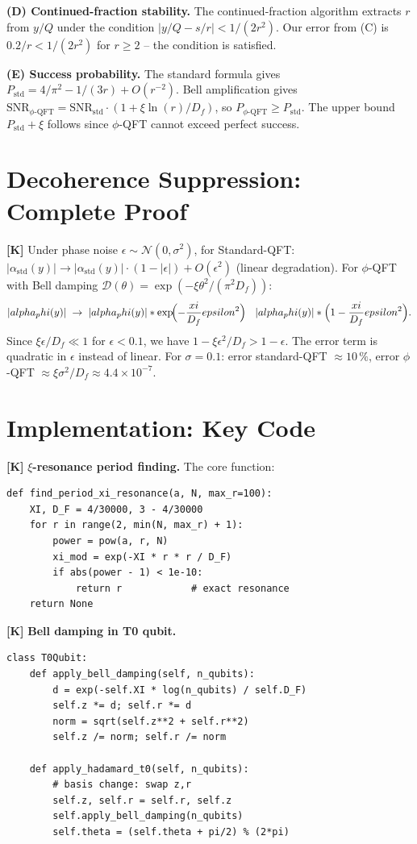 \textbf{(D) Continued-fraction stability.} The continued-fraction algorithm
extracts $r$ from $y/Q$ under the condition $|y/Q-s/r|<1/(2r^2)$. Our error
from (C) is $0{.}2/r<1/(2r^2)$ for $r\ge2$ -- the condition is satisfied.

\textbf{(E) Success probability.} The standard formula gives
$P_\text{std}=4/\pi^2-1/(3r)+O(r^{-2})$. Bell amplification gives
$\text{SNR}_{\phi\text{-QFT}} = \text{SNR}_\text{std}\cdot(1+\xi\ln(r)/D_f)$,
so $P_{\phi\text{-QFT}}\ge P_\text{std}$. The upper bound $P_\text{std}+\xi$
follows since $\phi$-QFT cannot exceed perfect success.

\section{Decoherence Suppression: Complete Proof}

\textbf{[K]} Under phase noise $\epsilon\sim\mathcal N(0,\sigma^2)$, for
Standard-QFT: $|\alpha_\text{std}(y)|\to|\alpha_\text{std}(y)|\cdot(1-|\epsilon|)+O(\epsilon^2)$
(linear degradation). For $\phi$-QFT with Bell damping
$\mathcal D(\theta)=\exp(-\xi\theta^2/(\pi^2D_f))$:
\[
  |\alpha_\phi(y)|\;\to\;|\alpha_\phi(y)|\cdot
  \exp\!\Bigl(-\frac\xi{D_f}\epsilon^2\Bigr)
  \;\approx\;|\alpha_\phi(y)|\cdot\Bigl(1-\frac\xi{D_f}\epsilon^2\Bigr).
\]
Since $\xi\epsilon/D_f\ll1$ for $\epsilon<0{.}1$, we have $1-\xi\epsilon^2/D_f>1-\epsilon$.
The error term is quadratic in $\epsilon$ instead of linear. For $\sigma=0{.}1$:
error standard-QFT $\approx10\,\%$, error $\phi$-QFT
$\approx\xi\sigma^2/D_f\approx4{.}4\times10^{-7}$.

\section{Implementation: Key Code}

\textbf{[K]} \textbf{$\xi$-resonance period finding.} The core function:

\begin{verbatim}
def find_period_xi_resonance(a, N, max_r=100):
    XI, D_F = 4/30000, 3 - 4/30000
    for r in range(2, min(N, max_r) + 1):
        power = pow(a, r, N)
        xi_mod = exp(-XI * r * r / D_F)
        if abs(power - 1) < 1e-10:
            return r            # exact resonance
    return None
\end{verbatim}

\textbf{[K]} \textbf{Bell damping in T0 qubit.}
\begin{verbatim}
class T0Qubit:
    def apply_bell_damping(self, n_qubits):
        d = exp(-self.XI * log(n_qubits) / self.D_F)
        self.z *= d; self.r *= d
        norm = sqrt(self.z**2 + self.r**2)
        self.z /= norm; self.r /= norm

    def apply_hadamard_t0(self, n_qubits):
        # basis change: swap z,r
        self.z, self.r = self.r, self.z
        self.apply_bell_damping(n_qubits)
        self.theta = (self.theta + pi/2) % (2*pi)
\end{verbatim}

